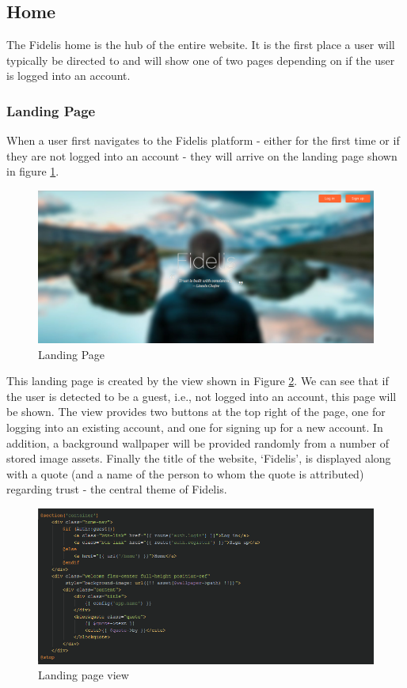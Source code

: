 \subsection{Home}
The Fidelis home is the hub of the entire website. It is the first place a user will typically be directed to and will show one of two pages depending on if the user is logged into an account.

\subsubsection{Landing Page}
When a user first navigates to the Fidelis platform - either for the first time or if they are not logged into an account - they will arrive on the landing page shown in figure \ref{fig:HomeUnauthorised}.  

\begin{figure}[H]
\centering
\includegraphics[width=\textwidth]{Images/Implementation/home_unauthorised}
\caption{Landing Page}
\label{fig:HomeUnauthorised}
\end{figure}

This landing page is created by the view shown in Figure \ref{fig:LandingView}. We can see that if the user is detected to be a guest, i.e., not logged into an account, this page will be shown. The view provides two buttons at the top right of the page, one for logging into an existing account, and one for signing up for a new account. In addition, a background wallpaper will be provided randomly from a number of stored image assets. Finally the title of the website, `Fidelis', is displayed along with a quote (and a name of the person to whom the quote is attributed) regarding trust - the central theme of Fidelis.

\begin{figure}[H]
\centering
\includegraphics[width=\textwidth]{Images/Implementation/LandingView}
\caption{Landing page view}
\label{fig:LandingView}
\end{figure}


